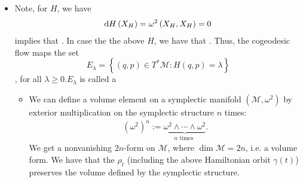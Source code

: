 \documentclass{article}
\begin{document}
\begin{enumerate}
\begin{itemize}
    \item  Note, for  $H$, we have
\begin{align*}
\mathrm{d} H\left(X_H\right)=\omega^2\left(X_H, X_H\right)=0
\end{align*}
implies that . In case the the above $H$, we have that . Thus, the cogeodesic flow maps the set $$E_\lambda=\left\{(q, p) \in T^* \mathcal{M}: H(q, p)=\lambda\right\}$$
, for all $\lambda \geq 0 . E_\lambda$ is called a 

\begin{itemize}[$\ast$]
    \item We can define a volume element on a symplectic manifold $\left(\mathcal{M}, \omega^2\right)$ by exterior multiplication on the symplectic structure $n$ times:
\begin{align*}
\left(\omega^2\right)^n:=\underbrace{\omega^2 \wedge \cdots \wedge \omega^2}_{n \text { times }} .
\end{align*}
We get a nonvanishing $2 n$-form on $\mathcal{M}$, where $\operatorname{dim} \mathcal{M}=2 n$, i.e. a volume form.
 We have that the $\rho_t$ (including the above Hamiltonian orbit $\gamma(t)$) preserves the volume defined by the symplectic structure.
\end{itemize}
\end{itemize}


\end{enumerate}
\end{document}
